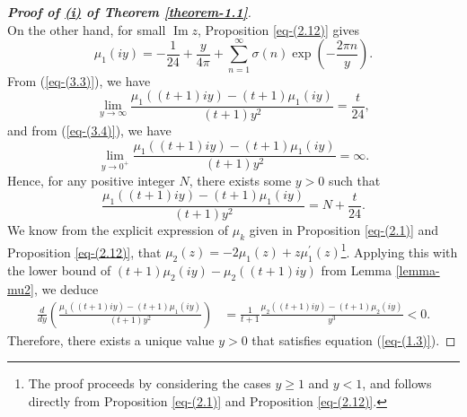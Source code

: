 \documentclass[11pt]{amsart}
\theoremstyle{plain}
\renewcommand{\Im}{\operatorname{Im}}
\numberwithin{equation}{section}
\begin{document}
\begin{proof}[\textbf{\boldmath Proof of  \hyperlink{thm1.1i}{(i)} of Theorem \ref{theorem-1.1}}]
\begin{equation}
			\end{equation}
			On the other hand, for small $\Im z$, Proposition \ref{eq-(2.12)} gives
			\begin{equation}\label{eq-(3.4)}
				\mu_{1}(iy) = -\frac{1}{24} + \frac{y}{4\pi} + \sum_{n=1}^{\infty} \sigma(n) \exp\left(-\frac{2\pi n}{y}\right).
			\end{equation}
			From (\ref{eq-(3.3)}), we have
			\begin{equation*}
				\lim_{y \to \infty} \frac{\mu_{1}((t+1)iy) - (t+1)\mu_{1}(iy)}{(t+1)y^{2}} = \frac{t}{24},
			\end{equation*}
			and from (\ref{eq-(3.4)}), we have
			\begin{equation*}
				\lim_{y \to 0^{+}} \frac{\mu_{1}((t+1)iy) - (t+1)\mu_{1}(iy)}{(t+1)y^{2}} = \infty.
			\end{equation*}
			Hence, for any positive integer $N$, there exists some $y > 0$ such that
			\begin{equation*}
				\frac{\mu_{1}((t+1)iy) - (t+1)\mu_{1}(iy)}{(t+1)y^{2}} = N + \frac{t}{24}.
			\end{equation*}
			We know from the explicit expression of $\mu_k$ given in Proposition \ref{eq-(2.1)} and Proposition \ref{eq-(2.12)}, that $\mu_{2}(z) = -2\mu_{1}(z) + z\mu_{1}^{\prime}(z)$\footnote{The proof proceeds by considering the cases $y \ge 1$ and $y < 1$, and follows directly from Proposition \ref{eq-(2.1)} and Proposition \ref{eq-(2.12)}.}.  Applying this with the lower bound of $(t+1)\mu_2(iy)-\mu_2((t+1)iy)$ from Lemma \ref{lemma-mu2}, we deduce
			\begin{align*}
				\frac{d}{dy}\left(\frac{\mu_{1}((t+1)iy) - (t+1)\mu_{1}(iy)}{(t+1)y^{2}}\right) 
				&= \frac{1}{t+1}  \frac{\mu_{2}((t+1)iy) - (t+1)\mu_{2}(iy)}{y^{3}} < 0.
			\end{align*}
			Therefore, there exists a unique value $y > 0$ that satisfies equation (\ref{eq-(1.3)}).
			

\end{proof}
\end{document}
